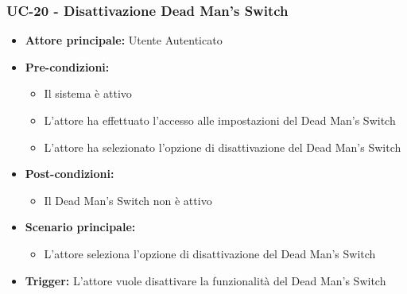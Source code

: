 \documentclass[a4paper,12pt]{article}
\begin{document}
\subsubsection{UC-20 - Disattivazione Dead Man's Switch} \label{sec:UC-20}
\begin{itemize}
    \item \textbf{Attore principale:} Utente Autenticato
    \item \textbf{Pre-condizioni:}
    \begin{itemize}
        \item Il sistema è attivo
        \item L'attore ha effettuato l'accesso alle impostazioni del Dead Man's Switch
        \item L'attore ha selezionato l'opzione di disattivazione del Dead Man's Switch
    \end{itemize}
    \item \textbf{Post-condizioni:}
    \begin{itemize}
        \item Il Dead Man's Switch non è attivo
    \end{itemize}
    \item \textbf{Scenario principale:} 
    \begin{itemize}
        \item L'attore seleziona l'opzione di disattivazione del Dead Man's Switch
    \end{itemize}
    \item \textbf{Trigger:} L'attore vuole disattivare la funzionalità del Dead Man's Switch
\end{itemize}

\end{document}
